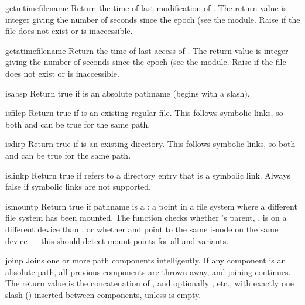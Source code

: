 \begin{funcdesc}{getmtime}{filename}
Return the time of last modification of .  The return
value is integer giving the number of seconds since the epoch (see the 
 module.  Raise  if the file does not
exist or is inaccessible.
\end{funcdesc}

\begin{funcdesc}{getatime}{filename}
Return the time of last access of .  The return
value is integer giving the number of seconds since the epoch (see the 
 module.  Raise  if the file does not
exist or is inaccessible.
\end{funcdesc}

\begin{funcdesc}{isabs}{p}
Return true if  is an absolute pathname (begins with a slash).
\end{funcdesc}

\begin{funcdesc}{isfile}{p}
Return true if  is an existing regular file.  This follows
symbolic links, so both  and 
can be true for the same path.
\end{funcdesc}

\begin{funcdesc}{isdir}{p}
Return true if  is an existing directory.  This follows
symbolic links, so both  and  can
be true for the same path.
\end{funcdesc}

\begin{funcdesc}{islink}{p}
Return true if
refers to a directory entry that is a symbolic link.
Always false if symbolic links are not supported.
\end{funcdesc}

\begin{funcdesc}{ismount}{p}
Return true if pathname  is a : a point in a
file system where a different file system has been mounted.  The
function checks whether 's parent, , is on a
different device than , or whether  and
 point to the same i-node on the same device --- this should
detect mount points for all \UNIX{} and \POSIX{} variants.
\end{funcdesc}

\begin{funcdesc}{join}{p}
Joins one or more path components intelligently.  If any component is
an absolute path, all previous components are thrown away, and joining
continues.  The return value is the concatenation of , and
optionally , etc., with exactly one slash () inserted
between components, unless  is empty.
\end{funcdesc}

